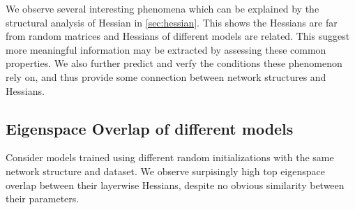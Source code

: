 \label{sec:empirical}
We observe several interesting phenomena which can be explained by the structural analysis of Hessian in \cref{sec:hessian}. This shows the Hessians are far from random matrices and Hessians of different models are related. This suggest more meaningful information may be extracted by assessing these common properties. We also further predict and verfy the conditions these phenomenon rely on, and thus provide some connection between network structures and Hessians. 

\subsection{Eigenspace Overlap of different models}
\label{sec:models}
Consider models trained using different random initializations with the same network structure and dataset. We observe surpisingly high top eigenspace overlap between their layerwise Hessians, despite no obvious similarity between their parameters.

